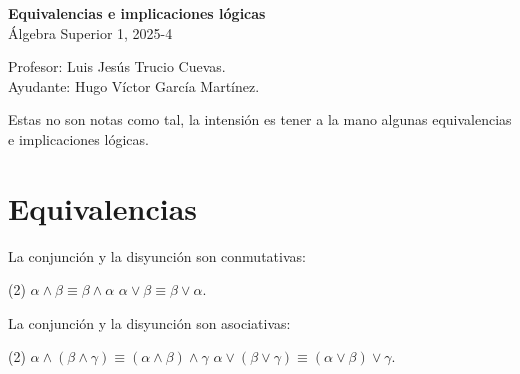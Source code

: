 \documentclass[letterpaper,DIV=12,headsepline,12pt]{scrartcl}
\begin{document}
\thispagestyle{beginstyle}
\begin{center}
  {\fontsize{30}{60}\rmfamily \textbf{Equivalencias e implicaciones lógicas}}
  \\ \vspace{.2cm}
  Álgebra Superior 1, 2025-4
\end{center}
\begin{flushright}
  \footnotesize \hfill Profesor: Luis Jesús Trucio Cuevas.\\
  \hfill Ayudante: Hugo Víctor García Martínez.
\end{flushright}

\noindent
Estas no son notas como tal, la intensión es tener a la mano algunas
equivalencias e implicaciones lógicas.

\section{Equivalencias}
La conjunción y la disyunción son conmutativas:
\begin{tasks}(2)
  \task \(\alpha\land\beta\equiv\beta\land\alpha\)
  \task \(\alpha\lor\beta\equiv\beta\lor\alpha\).
\end{tasks}
%
La conjunción y la disyunción son asociativas:
\begin{tasks}(2)
  \task \(\alpha\land(\beta\land\gamma)\equiv(\alpha\land\beta)\land\gamma\)
  \task \(\alpha\lor(\beta\lor\gamma)\equiv(\alpha\lor\beta)\lor\gamma\).
\end{tasks}
\end{document}
